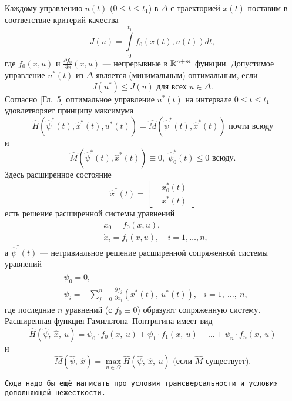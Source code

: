 Каждому управлению $u(t)$ ($0 \leqslant t \leqslant t_1$) в $\Delta$ с траекторией $x(t)$ поставим в соответствие критерий качества
$$
        J(u) = \int\limits_0^{t_1} f_0(x(t), u(t)) dt,
$$
где $f_0(x, u)$ и $\frac{\partial f_0}{\partial x}(x, u)$ --- непрерывные в $\mathbb{R}^{n+m}$ функции. Допустимое управление $u^*(t)$ из $\Delta$ является (минимальным) оптимальным, если
$$
        J(u^*) \leqslant J(u) \mbox{ для всех } u \in \Delta.
$$
Согласно \cite{li}[Гл.~5] оптимальное управление $u^*(t)$ на интервале $0 \leqslant t \leqslant t_1$ удовлетворяет принципу максимума
$$
        \hat{H}(\hat{\psi}^*(t), \hat{x}^*(t), u^*(t)) = \hat{M}(\hat{\psi}^*(t), \hat{x}^*(t)) \mbox{ почти всюду}
$$
и
$$
        \hat{M}(\hat{\psi}^*(t), \hat{x}^*(t)) \equiv 0,\; \hat{\psi}^*_0(t) \leqslant 0 \mbox{ всюду.}
$$
Здесь расширенное состояние
$$
        \hat{x}^*(t) =
        \left[
        \begin{aligned}
                &x_0^* (t) \\
                &x^*   (t)
        \end{aligned}
        \right]
$$
есть решение расширенной системы уравнений
$$
        \begin{aligned}
                &\dot x_0 = f_0(x, u),&\\
                &\dot x_i = f_i(x, u),  &i = 1, \ldots, n,
        \end{aligned}
$$
а $\hat\psi^*(t)$ --- нетривиальное решение расширенной сопряженной системы уравнений
$$
        \begin{aligned}
                &\dot\psi_0 = 0, \\
                &\dot\psi_i = - \sum\limits_{j=0}^{n}\frac{\partial f_j}{\partial x_i}(x^*(t),\: u^*(t)), & i = 1,\: \ldots ,\: n,
        \end{aligned}
$$
где последние $n$ уравнений (с $f_0 \equiv 0$) образуют сопряженную систему. Расширенная функция Гамильтона--Понтрягина имеет вид
$$
        \hat H (\hat\psi,\: \hat x,\: u) = \psi_0 \cdot f_0(x,\: u) + \psi_1 \cdot f_1(x,\: u) + \ldots + \psi_n \cdot f_n(x,\: u)
$$
и
$$
        \hat M (\hat\psi,\: \hat x) = \max\limits_{u \in \Omega}\hat H (\hat\psi,\:\hat x,\: u) \mbox{ (если $\hat M$ существует).}
$$

\texttt{Сюда надо бы ещё написать про условия трансверсальности и условия дополняющей нежесткости.}
